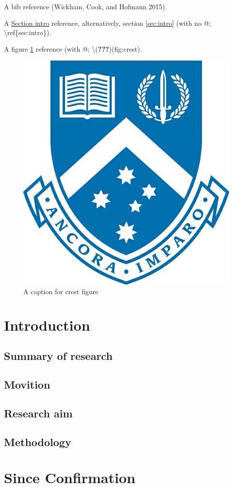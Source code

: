 \documentclass[11,]{article}
\begin{document}
A bib reference (Wickham, Cook, and Hofmann 2015).

A \protect\hyperlink{sec:intro}{Section intro} reference, alternatively, section \ref{sec:intro} (with no @; \textbackslash ref\{sec:intro\}).

A figure \ref{fig:crest} reference (with @; \textbackslash{}({\textbf{???}})(fig:crest).

\begin{figure}

{\centering \includegraphics[width=0.2\linewidth,height=0.2\textheight]{figures/can_con/crest} 

}

\caption{A caption for crest figure}\label{fig:crest}
\end{figure}

\hypertarget{introduction}{%
\section{Introduction}\label{introduction}}

\hypertarget{summary-of-research}{%
\subsection{Summary of research}\label{summary-of-research}}

\hypertarget{movition}{%
\subsection{Movition}\label{movition}}

\hypertarget{research-aim}{%
\subsection{Research aim}\label{research-aim}}

\hypertarget{methodology}{%
\subsection{Methodology}\label{methodology}}

\hypertarget{since-confirmation}{%
\section{Since Confirmation}\label{since-confirmation}}
\end{document}
